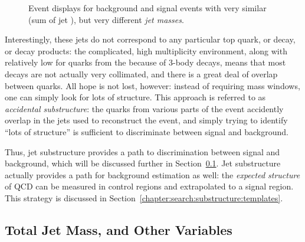 
\begin{figure}
\centering
{}
\label{fig:search:motivation:event-displays}
\caption{Event displays for background and signal events with very similar \Ht (sum of jet \pt), but very different \textit{jet masses}.}
\end{figure}


Interestingly, these \largeR jets do not correspond to any particular top quark, or \lsp decay, or \gl decay products: the complicated, high multiplicity environment, along with relatively low \pt for quarks from the \lsp because of 3-body decays, means that most decays are not actually very collimated, and there is a great deal of overlap between quarks. All hope is not lost, however: instead of requiring mass windows, one can simply look for lots of structure. This approach is referred to as \textit{accidental substructure}: the quarks from various parts of the event accidently overlap in the \largeR jets used to reconstruct the event, and simply trying to identify ``lots of structure'' is sufficient to discriminate between signal and background. 

Thus, jet substructure provides a path to discrimination between signal and background, which will be discussed further in Section~\ref{chapter:search:substructure:mj}. Jet substructure actually provides a path for background estimation as well: the \textit{expected structure} of QCD can be measured in control regions and extrapolated to a signal region. This strategy is discussed in Section~\ref{chapter:search:substructure:templates}. 

\subsection{Total Jet Mass, and Other Variables}
	\label{chapter:search:substructure:mj}

